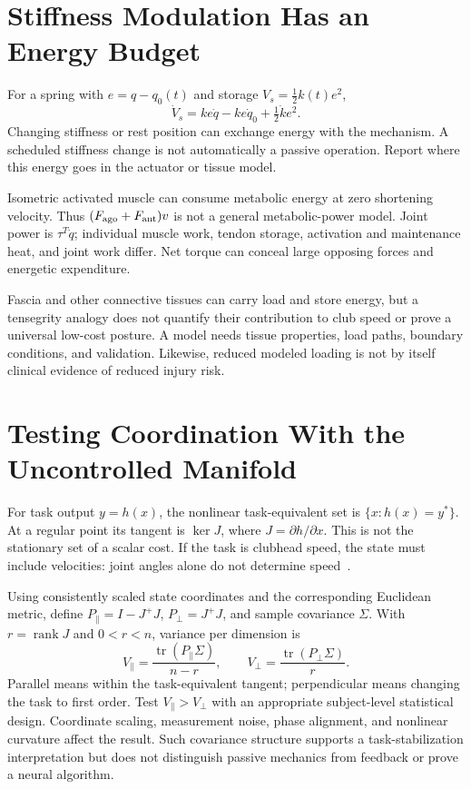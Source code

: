 \section{Stiffness Modulation Has an Energy Budget}
\label{sec:overconstraint_costs}

For a spring with $e=q-q_0(t)$ and storage $V_s=\tfrac12k(t)e^2$,
\begin{equation}
\dot V_s=ke\dot q-ke\dot q_0+\tfrac12\dot k e^2.
\end{equation}
Changing stiffness or rest position can exchange energy with the mechanism.
A scheduled stiffness change is not automatically a passive operation. Report
where this energy goes in the actuator or tissue model.

Isometric activated muscle can consume metabolic energy at zero shortening
velocity. Thus $(F_{\rm ago}+F_{\rm ant})v$ is not a general metabolic-power
model. Joint power is $\tau^T\dot q$; individual muscle work, tendon storage,
activation and maintenance heat, and joint work differ. Net torque can conceal
large opposing forces and energetic expenditure.

Fascia and other connective tissues can carry load and store energy, but a
tensegrity analogy does not quantify their contribution to club speed or prove
a universal low-cost posture. A model needs tissue properties, load paths,
boundary conditions, and validation. Likewise, reduced modeled loading is not
by itself clinical evidence of reduced injury risk.

\section{Testing Coordination With the Uncontrolled Manifold}
\label{sec:experimental_evidence}

For task output $y=h(x)$, the nonlinear task-equivalent set is
$\{x:h(x)=y^*\}$. At a regular point its tangent is $\ker J$, where
$J=\partial h/\partial x$. This is not the stationary set of a scalar cost.
If the task is clubhead speed, the state must include velocities: joint angles
alone do not determine speed~\cite{Scholz1999}.

Using consistently scaled state coordinates and the corresponding Euclidean
metric, define $P_\parallel=I-J^+J$, $P_\perp=J^+J$, and sample covariance
$\Sigma$. With $r=\operatorname{rank}J$ and $0<r<n$, variance per dimension is
\begin{equation}
V_\parallel=\frac{\operatorname{tr}(P_\parallel\Sigma)}{n-r},\qquad
V_\perp=\frac{\operatorname{tr}(P_\perp\Sigma)}{r}.
\end{equation}
Parallel means within the task-equivalent tangent; perpendicular means changing
the task to first order. Test $V_\parallel>V_\perp$ with an appropriate
subject-level statistical design. Coordinate scaling, measurement noise,
phase alignment, and nonlinear curvature affect the result. Such covariance
structure supports a task-stabilization interpretation but does not distinguish
passive mechanics from feedback or prove a neural algorithm.

